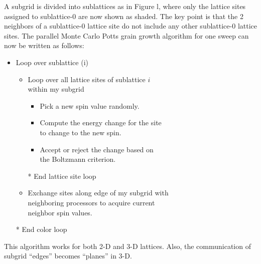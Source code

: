 \documentclass[11pt]{article}
\begin{document}
\begin{multicols}{2}
A subgrid is divided into sublattices as in Figure l, where only the lattice sites assigned to sublattice-0 are now shown as shaded.
The key point is that the 2 neighbors of a sublattice-0 lattice site do not include any other sublattice-0 lattice sites.
The parallel Monte Carlo Potts grain growth algorithm for one sweep can now be written as follows:
\begin{minipage}{0.45\textwidth}\centering
\begin{shadebox}
\begin{itemize}
  \item Loop over sublattice (i)
  \begin{itemize}
    \item Loop over all lattice sites of sublattice $i$\\ within my subgrid
    \begin{itemize}
      \item Pick a new spin value randomly.
      \item Compute the energy change for the site\\ to change to the new spin.
      \item Accept or reject the change based on\\ the Boltzmann criterion.
    \end{itemize}
    \item[*] End lattice site loop
    \item Exchange sites along edge of my subgrid with\\ neighboring processors to acquire current\\ neighbor spin values.
    \end{itemize}
    \item[*] End color loop
\end{itemize}
\end{shadebox}
\end{minipage}

This algorithm works for both 2-D and 3-D lattices. Also, the communication of subgrid ``edges'' becomes ``planes'' in 3-D. 


\end{multicols}
\end{document}

